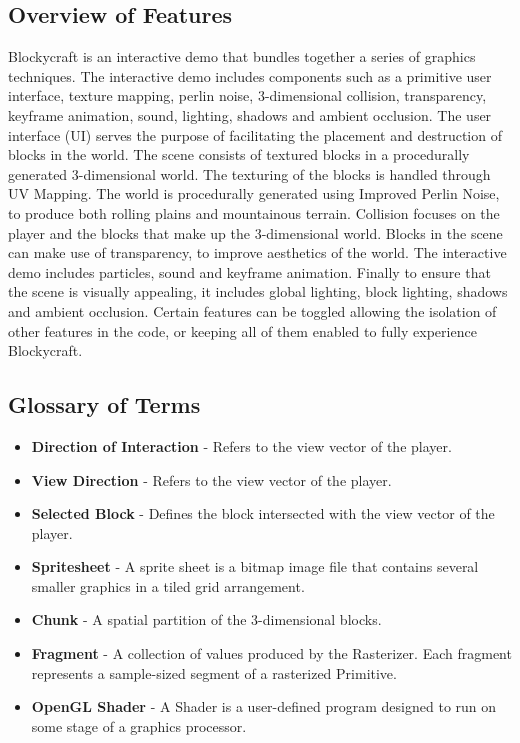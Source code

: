 \documentclass[a4paper,11pt,titlepage]{scrartcl}
\newcommand{\Blockycraft}{Blockycraft}
\begin{document}
\subsection{Overview of Features}
\Blockycraft{} is an interactive demo that bundles together a series of graphics techniques. The interactive demo includes components such as a primitive user interface, texture mapping, perlin noise, 3-dimensional collision, transparency, keyframe animation, sound, lighting, shadows and ambient occlusion. The user interface (UI) serves the purpose of facilitating the placement and destruction of blocks in the world. The scene consists of textured blocks in a procedurally generated 3-dimensional world. The texturing of the blocks is handled through UV Mapping. The world is procedurally generated using Improved Perlin Noise, to produce both rolling plains and mountainous terrain. Collision focuses on the player and the blocks that make up the 3-dimensional world. Blocks in the scene can make use of transparency, to improve aesthetics of the world. The interactive demo includes particles, sound and keyframe animation. Finally to ensure that the scene is visually appealing, it includes global lighting, block lighting, shadows and ambient occlusion. Certain features can be toggled allowing the isolation of other features in the code, or keeping all of them enabled to fully experience \Blockycraft{}.

\subsection{Glossary of Terms}
\begin{itemize}
\item \textbf{Direction of Interaction} - Refers to the view vector of the player.
\item \textbf{View Direction} - Refers to the view vector of the player.
\item \textbf{Selected Block} - Defines the block intersected with the view vector of the player.
\item \textbf{Spritesheet} - A sprite sheet is a bitmap image file that contains several smaller graphics in a tiled grid arrangement.
\item \textbf{Chunk} - A spatial partition of the 3-dimensional blocks.
\item \textbf{Fragment} - A collection of values produced by the Rasterizer. Each fragment represents a sample-sized segment of a rasterized Primitive.
\item \textbf{OpenGL Shader} - A Shader is a user-defined program designed to run on some stage of a graphics processor.
\end{itemize}
\end{document}
